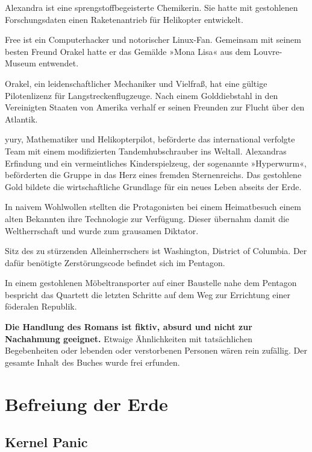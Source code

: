 Alexandra ist eine sprengstoffbegeisterte Chemikerin. Sie hatte mit gestohlenen Forschungsdaten einen Raketenantrieb für Helikopter entwickelt.

Free ist ein Computerhacker und notorischer Linux-Fan. Gemeinsam mit seinem besten Freund Orakel hatte er das Gemälde »Mona Lisa« aus dem Louvre-Museum entwendet.

Orakel, ein leidenschaftlicher Mechaniker und Vielfraß, hat eine gültige Pilotenlizenz für Langstreckenflugzeuge. Nach einem Golddiebstahl in den Vereinigten Staaten von Amerika verhalf er seinen Freunden zur Flucht über den Atlantik.

yury, Mathematiker und Helikopterpilot, beförderte das international verfolgte Team mit einem modifizierten Tandemhubschrauber ins Weltall. Alexandras Erfindung und ein vermeintliches Kinderspielzeug, der sogenannte »Hyperwurm«, beförderten die Gruppe in das Herz eines fremden Sternenreichs. Das gestohlene Gold bildete die wirtschaftliche Grundlage für ein neues Leben abseits der Erde.



\noindent In naivem Wohlwollen stellten die Protagonisten bei einem Heimatbesuch einem alten Bekannten ihre Technologie zur Verfügung. Dieser übernahm damit die Weltherrschaft und wurde zum grausamen Diktator.

Sitz des zu stürzenden Alleinherrschers ist Washington, District of Columbia. Der dafür benötigte Zerstörungscode befindet sich im Pentagon.

In einem gestohlenen Möbeltransporter auf einer Baustelle nahe dem Pentagon bespricht das Quartett die letzten Schritte auf dem Weg zur Errichtung einer föderalen Republik.



\noindent \textbf{Die Handlung des Romans ist fiktiv, absurd und nicht zur Nachahmung geeignet.} Etwaige Ähnlichkeiten mit tatsächlichen Begebenheiten oder lebenden oder verstorbenen Personen wären rein zufällig. Der gesamte Inhalt des Buches wurde frei erfunden.

\newpage

\part{Befreiung der Erde}

\chapter{Kernel Panic}

